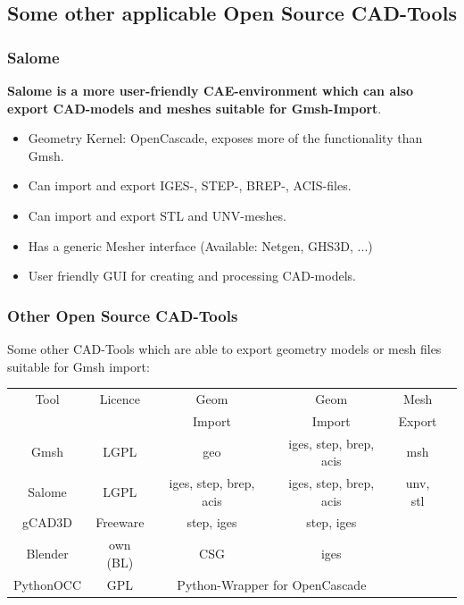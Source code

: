 \subsection{Some other applicable Open Source CAD-Tools}

\begin{frame}
  \frametitle{Salome}
  \textbf{Salome is a more user-friendly CAE-environment which can also export
  CAD-models and meshes suitable for Gmsh-Import}.
  \begin{itemize}
    \item Geometry Kernel: OpenCascade, exposes more of the functionality than Gmsh.
    \item Can import and export IGES-, STEP-, BREP-, ACIS-files.
    \item Can import and export STL and UNV-meshes.
    \item Has a generic Mesher interface (Available: Netgen, GHS3D, ...)
    \item User friendly GUI for creating and processing CAD-models.
  \end{itemize}
\end{frame}

\begin{frame}
  \frametitle{Other Open Source CAD-Tools}
    Some other CAD-Tools which are able to export geometry models or mesh
    files suitable for Gmsh import:
    \begin{center}
      \small
      \begin{tabular}{|c|c|c|c|c|c|}
        \hline
        Tool & Licence & Geom & Geom & Mesh
        \\
        &  & Import & Import & Export
        \\
        \hline
        \hline
        Gmsh & LGPL & geo & iges, step, brep, acis & msh
        \\
        \hline
        Salome & LGPL & iges, step, brep, acis & iges, step, brep, acis & unv,
        stl
        \\
        \hline
        gCAD3D & Freeware & step, iges & step, iges &
        \\
        \hline
        Blender & own (BL) & CSG & iges &
        \\
        \hline
        PythonOCC & GPL & \multicolumn{2}{c}{Python-Wrapper for OpenCascade} &
        \\
        \hline
      \end{tabular}
    \end{center}
\end{frame}

\cleardoublepage
